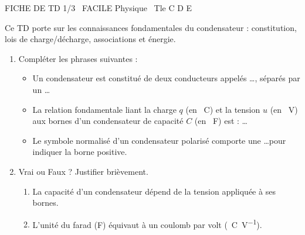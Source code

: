 \documentclass[11pt]{article}
\begin{document}
\begin{tcolorbox}[enhanced,colback=popink,colframe=popink,arc=10pt,boxrule=0pt,left=12pt,right=12pt,top=9pt,bottom=9pt]
{\color{white}\popxbold\small FICHE DE TD 1/3 \textbullet\ FACILE \hfill Physique \textbullet\ Tle C D E\par}
\end{tcolorbox}
\vspace{4pt}
Ce TD porte sur les connaissances fondamentales du condensateur : constitution, lois de charge/décharge, associations et énergie.

\begin{exercice}
\begin{enumerate}
    \item Compléter les phrases suivantes :
    \begin{itemize}
        \item Un condensateur est constitué de deux conducteurs appelés \ldots, séparés par un \ldots
        \item La relation fondamentale liant la charge $q$ (en \SI{}{C}) et la tension $u$ (en \SI{}{V}) aux bornes d'un condensateur de capacité $C$ (en \SI{}{F}) est : \ldots
        \item Le symbole normalisé d'un condensateur polarisé comporte une \ldots pour indiquer la borne positive.
    \end{itemize}
    \item Vrai ou Faux ? Justifier brièvement.
    \begin{enumerate}
        \item La capacité d'un condensateur dépend de la tension appliquée à ses bornes.
        \item L'unité du farad (F) équivaut à un coulomb par volt (\SI{}{C.V^{-1}}).
    \end{enumerate}
\end{enumerate}
\end{exercice}
\end{document}
